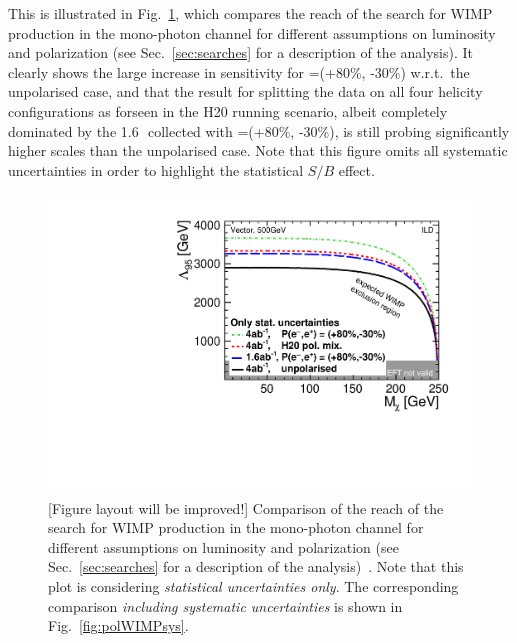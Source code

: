 This is illustrated in Fig.~\ref{fig:polWIMPstat}, which compares the reach of the search for WIMP production in the mono-photon channel for different assumptions on luminosity and polarization (see Sec.~\ref{sec:searches} for a description of the analysis). It clearly shows the large increase in sensitivity for \Pmp=(+80\%, -30\%) w.r.t.\ the unpolarised case, and that the result for splitting the data on all four helicity configurations as forseen in the H20 running scenario, albeit completely dominated by the 1.6\,\iab\ collected with \Pmp=(+80\%, -30\%), is still probing significantly higher scales than the unpolarised case. Note that this figure omits all systematic uncertainties in order to highlight the statistical $S/B$ effect. 
\begin{figure}
\centering
\includegraphics[width=0.95\linewidth]{./chapters/figures/vector_noSystematics.pdf}
		
\caption{{\color{red}[Figure layout will be improved!]} Comparison of the reach of the search for WIMP production in the mono-photon channel for different assumptions on luminosity and polarization (see Sec.~\ref{sec:searches} for a description of the analysis)~\cite{Habermehl:417605}. Note that this plot is considering {\em statistical uncertainties only}. The corresponding comparison {\em including systematic uncertainties} is shown in Fig.~\ref{fig:polWIMPsys}.}
\label{fig:polWIMPstat}
\end{figure}


